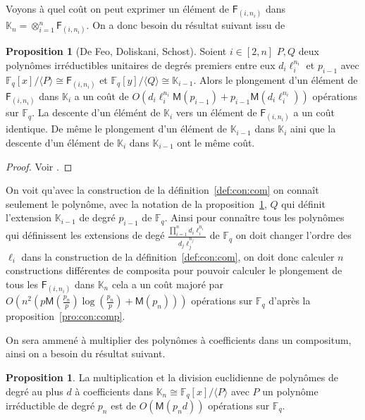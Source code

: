 \documentclass[10pt,a4paper]{book}
\theoremstyle{plain}
\theoremstyle{definition}
\theoremstyle{definition}
\theoremstyle{definition}
\newtheorem{prop}[thm]{Proposition}
\theoremstyle{definition}
\theoremstyle{remark}
\theoremstyle{remark}
\theoremstyle{definition}
\begin{document}
 Voyons à quel coût on peut exprimer un élément de $\mathsf{F}_{(i,n_i)}$ dans 
 $\mathbb{K}_n=\otimes_{i=1}^n\mathsf{F}_{(i,n_i)}$. On a donc 
 besoin du résultat suivant issu de \cite[Theorem 1]{DeFeoDoliskaniSchost14}
 \begin{prop}[De Feo, Doliskani, Schost]
 \label{pro:com:inj}
 Soient $i \in [2,n] $ $P,Q$ deux polynômes irréductibles unitaires de degrés 
 premiers entre eux $d_i\ell_i^{n_i}$ et $p_{i-1}$ avec
   $\mathbb{F}_q[x]/\langle P \rangle \cong \mathsf{F}_{(i,n_i)}$ et 
   $\mathbb{F}_q[y]/\langle Q \rangle \cong \mathbb{K}_{i-1}$. Alors le 
   plongement d'un élément de $\mathsf{F}_{(i,n_i)} $  dans $\mathbb{K}_{i}$ a un
   coût de 
   $O(d_i\ell_i^{n_i}\mathsf{M}(p_{i-1})+p_{i-1}\mathsf{M}(d_i\ell_i^{n_i}))$ 
   opérations sur $\mathbb{F}_q$. La descente d'un élémént de $\mathbb{K}_{i} $
   vers un élément de $\mathsf{F}_{(i,n_i)}$  a un coût identique. 
   De même le plongement d'un élément de $\mathbb{K}_{i-1}$ dans 
   $\mathbb{K}_{i}$ aini que la descente d'un élément de $\mathbb{K}_{i}$ dans 
   $\mathbb{K}_{i-1}$ ont le même coût.
 \end{prop}

 \begin{proof}
 Voir \cite{DeFeoDoliskaniSchost14}.
\end{proof}  

On voit qu'avec la construction de la définition~\ref{def:con:com} on connaît 
seulement le polynôme, avec la notation de la proposition~\ref{pro:com:inj}, $Q$
qui définit l'extension $\mathbb{K}_{i-1}$ de degré $p_{i-1}$ de 
$\mathbb{F}_q$. Ainsi pour connaître tous les polynômes qui définissent les 
extensions de degé $\frac{\prod_{i=1}^{n}d_i\ell_i^{n_i}}{d_j \ell_j^{n_j}}$ de
$\mathbb{F}_q$ on doit changer l'ordre des $\ell_i$ dans la construction de la 
définition~\ref{def:con:com}, on doit donc calculer $n$ constructions 
différentes de composita pour pouvoir calculer le plongement de tous les 
$\mathsf{F}_{(i,n_i)}$ dans $\mathbb{K}_{n}$ cela a un coût majoré par 
$O(n^2(p\mathsf{M}(\frac{p_n}{p})\log(\frac{p_n}{p})+\mathsf{M}(p_n)))$ 
opérations sur $\mathbb{F}_q$ d'après la proposition~\ref{pro:con:comp}.

 On sera ammené à multiplier des polynômes à coefficients dans un 
 compositum, ainsi on a besoin du résultat suivant.

 \begin{prop}
 \label{pro:mul:com}
 La multiplication et la division euclidienne de polynômes de degré au plus $d$
 à coefficients dans $\mathbb{K}_{n} \cong \mathbb{F}_q[x]/ \langle P \rangle$
 avec $P$ un polynôme irréductible de degré $p_n$ est de $O(\mathsf{M}(p_nd))$ 
 opérations sur $\mathbb{F}_q$.
 \end{prop} 
 
\end{document}
